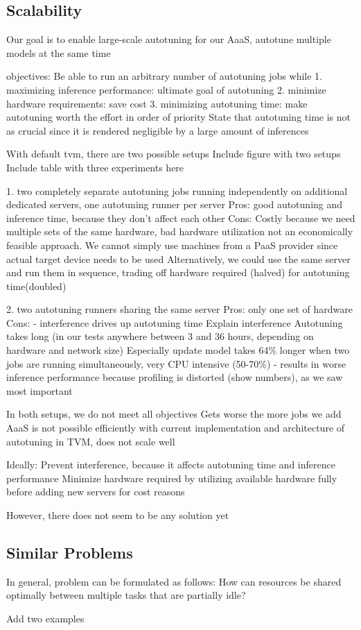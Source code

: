 \subsection{Scalability}
Our goal is to enable large-scale autotuning for our AaaS, autotune multiple models at the same time

objectives:
Be able to run an arbitrary number of autotuning jobs while
1. maximizing inference performance: ultimate goal of autotuning
2. minimize hardware requirements: save cost
3. minimizing autotuning time: make autotuning worth the effort
in order of priority
State that autotuning time is not as crucial since it is rendered negligible by a large amount of inferences

With default tvm, there are two possible setups
Include figure with two setups
Include table with three experiments here

1. two completely separate autotuning jobs running independently on additional dedicated servers, one autotuning runner per server
Pros: good autotuning and inference time, because they don't affect each other
Cons: Costly because we need multiple sets of the same hardware, bad hardware utilization
not an economically feasible approach. We cannot simply use machines from a PaaS provider since actual target device needs to be used
Alternatively, we could use the same server and run them in sequence, trading off hardware required (halved) for autotuning time(doubled)

2. two autotuning runners sharing the same server
Pros: only one set of hardware
Cons:
- interference drives up autotuning time
Explain interference
Autotuning takes long (in our tests anywhere between 3 and 36 hours, depending on hardware and network size)
Especially update model takes 64\% longer when two jobs are running simultaneously, very CPU intensive (50-70\%)
- results in worse inference performance because profiling is distorted (show numbers), as we saw most important

In both setups, we do not meet all objectives
Gets worse the more jobs we add
AaaS is not possible efficiently with current implementation and architecture of autotuning in TVM, does not scale well

Ideally:
Prevent interference, because it affects autotuning time and inference performance
Minimize hardware required by utilizing available hardware fully before adding new servers for cost reasons

However, there does not seem to be any solution yet

\subsection{Similar Problems}
In general, problem can be formulated as follows:
How can resources be shared optimally between multiple tasks that are partially idle?

Add two examples